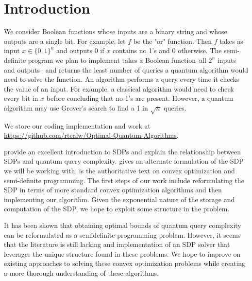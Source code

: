 \section{Introduction}

We consider Boolean functions whose inputs
are a binary string and whose outputs are a single bit.
For example, let $f$ be the "or" function.
Then $f$ takes as input $x \in \{0,1\}^n$ and outputs
0 if $x$ contains no 1's and 0 otherwise.
The semi-definite program we plan to implement
takes a Boolean function--all $2^n$ inputs and outputs--
and returns the least number of queries a quantum
algorithm would need to solve the function.
An algorithm performs a query every time it checks the value
of an input.
For example, a classical algorithm would need to check every
bit in $x$ before concluding that no 1's are present.
However, a quantum algorithm may use Grover's search
to find a 1 in $\sqrt{n}$ queries.

We store our coding implementation and work at
\url{https://github.com/rtealw/Optimal-Quantum-Algorithms}.

\cite{beigi2018span} provide an excellent introduction to SDPs
and explain the relationship between SDPs and quantum query complexity.
\cite{reichardt2009span} gives an alternate formulation of the SDP
we will be working with.
\cite{boyd2004convex} is the authoritative text on convex optimization
and semi-definite programming.
The first steps of our work include reformulating the SDP in terms
of more standard convex optimization algorithms and then implementing
our algorithm.
Given the exponential nature of the storage and computation of the
SDP, we hope to exploit some structure in the problem.

It has been shown that obtaining optimal bounds of
quantum query complexity can be reformulated as a
semidefinite programming problem. However, it seems that
the literature is still lacking and implementation of an
SDP solver that leverages the unique structure found in
these problems. We hope to improve on existing approaches
to solving these convex optimization problems while
creating a more thorough understanding of these
algorithms.